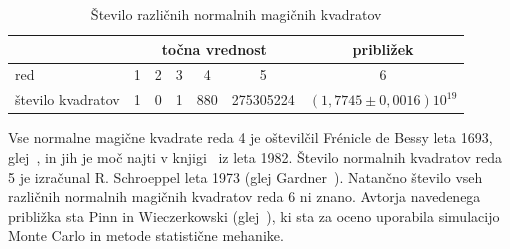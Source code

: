 \documentclass[a4paper,12pt]{article}
\begin{document}
\begin{table}[!ht]
   \centering
   \caption{Število različnih normalnih magičnih kvadratov}
   \label{table:stevila}
   \begin{tabular}{lcccccc}\toprule
      & \multicolumn{5}{c}{točna vrednost} & približek \\
      \midrule
      red & 1 & 2 & 3 & 4 & 5 & 6 \\
      število kvadratov & 1 & 0 & 1 & 880 & 275305224 & \((1{,}7745\pm0{,}0016)10^{19}\) \\
      \bottomrule
   \end{tabular}
\end{table}

Vse normalne magične kvadrate reda 4 je oštevilčil Frénicle de Bessy
leta 1693, glej~\cite{bessy}, in jih je moč najti v knjigi~\cite{berlekamp}
iz leta 1982. Število normalnih kvadratov reda 5 je izračunal
R. Schroeppel leta 1973 (glej Gardner~\cite{gardner}).
Natančno število vseh različnih normalnih magičnih kvadratov reda 6 ni znano.
Avtorja navedenega približka sta Pinn in Wieczerkowski (glej~\cite{pinn}), ki
sta za oceno uporabila simulacijo Monte Carlo in metode statistične mehanike.


\newpage





\end{document}
